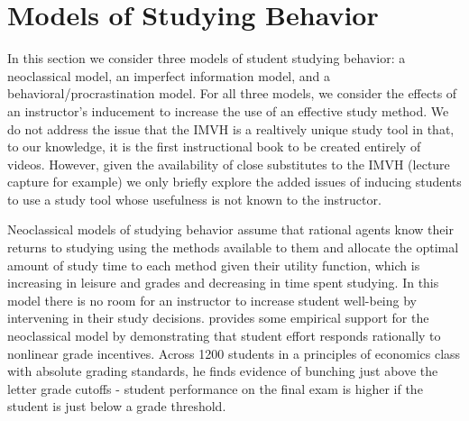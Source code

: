 \documentclass[12pt]{article}
\begin{document}

\section{Models of Studying Behavior}

In this section we consider three models of student studying behavior: a neoclassical model, an imperfect information model, and a behavioral/procrastination model. For all three models, we consider the effects of an instructor's inducement to increase the use of an effective study method. We do not address the issue that the IMVH is a realtively unique study tool in that, to our knowledge, it is the first instructional book to be created entirely of videos. However, given the availability of close substitutes to the IMVH (lecture capture for example) we only briefly explore the added issues of inducing students to use a study tool whose usefulness is not known to the instructor.

Neoclassical models of studying behavior assume that rational agents know their returns to studying using the methods available to them and allocate the optimal amount of study time to each method given their utility function, which is increasing in leisure and grades and decreasing in time spent studying. In this model there is no room for an instructor to increase student well-being by intervening in their study decisions. \textcite{oettinger2002} provides some empirical support for the neoclassical model by demonstrating that student effort responds rationally to nonlinear grade incentives. Across 1200 students in a principles of economics class with absolute grading standards, he finds evidence of bunching just above the letter grade cutoffs - student performance on the final exam is higher if the student is just below a grade threshold.
\end{document}
